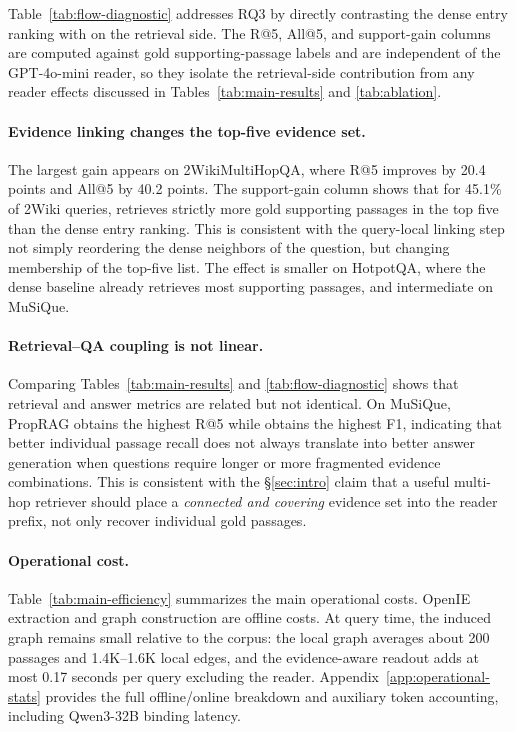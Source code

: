 Table~\ref{tab:flow-diagnostic} addresses RQ3 by directly contrasting
the dense entry ranking with \methodname{} on the retrieval side.
The R@5, All@5, and support-gain columns are computed against gold
supporting-passage labels and are independent of the GPT-4o-mini
reader, so they isolate the retrieval-side contribution from any
reader effects discussed in Tables~\ref{tab:main-results} and
\ref{tab:ablation}.
\paragraph{Evidence linking changes the top-five evidence set.}
The largest gain appears on 2WikiMultiHopQA, where R@5 improves by
20.4 points and All@5 by 40.2 points. The support-gain column shows
that for 45.1\% of 2Wiki queries, \methodname{} retrieves strictly
more gold supporting passages in the top five than the dense entry
ranking. This is consistent with the query-local linking step not simply
reordering the dense neighbors of the question, but changing
membership of the top-five list. The effect is smaller on HotpotQA,
where the dense baseline already retrieves most supporting passages,
and intermediate on MuSiQue.

\paragraph{Retrieval--QA coupling is not linear.}
Comparing Tables~\ref{tab:main-results} and \ref{tab:flow-diagnostic}
shows that retrieval and answer metrics are related but not identical.
On MuSiQue, PropRAG obtains the highest R@5 while \methodname{} obtains
the highest F1, indicating that better individual passage recall does
not always translate into better answer generation when questions
require longer or more fragmented evidence combinations. This is
consistent with the \S\ref{sec:intro} claim that a useful multi-hop
retriever should place a \emph{connected and covering} evidence set
into the reader prefix, not only recover individual gold passages.

\paragraph{Operational cost.}
Table~\ref{tab:main-efficiency} summarizes the main operational costs.
OpenIE extraction and graph construction are offline costs. At query
time, the induced graph remains small relative to the corpus: the
local graph averages about 200 passages and 1.4K--1.6K local edges, and
the evidence-aware readout adds at most 0.17 seconds per query
excluding the reader. Appendix~\ref{app:operational-stats} provides the
full offline/online breakdown and auxiliary token accounting, including
Qwen3-32B binding latency.

